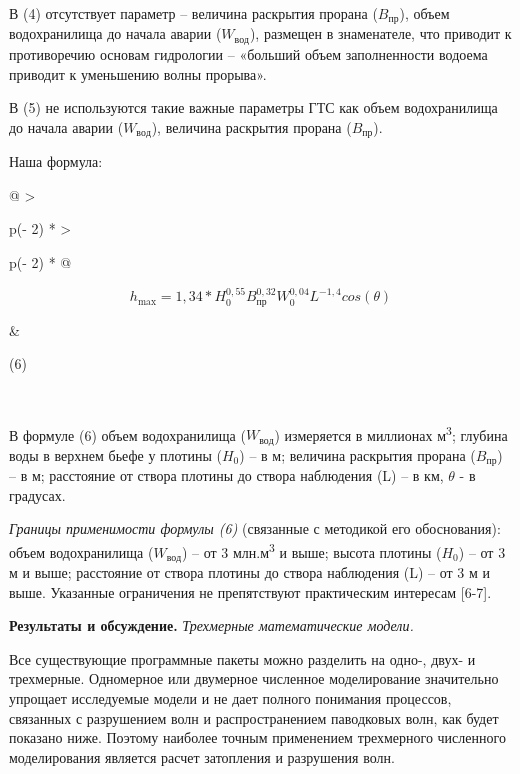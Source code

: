 В (4) отсутствует параметр -- величина раскрытия прорана (\(B_{пр}\)),
объем водохранилища до начала аварии (\(W_{вод}\)), размещен в
знаменателе, что приводит к противоречию основам гидрологии -- «больший
объем заполненности водоема приводит к уменьшению волны прорыва».

В (5) не используются такие важные параметры ГТС как объем водохранилища
до начала аварии (\(W_{вод}\)), величина раскрытия прорана (\(B_{пр}\)).

Наша формула:

\begin{longtable}[]{@{}
  >{\raggedright\arraybackslash}p{(\columnwidth - 2\tabcolsep) * }
  >{\raggedright\arraybackslash}p{(\columnwidth - 2\tabcolsep) * }@{}}
\toprule\noalign{}
\begin{minipage}[b]{\linewidth}\raggedright
\[h_{\max} = 1,34*H_{0}^{0,55}B_{пр}^{0,32}W_{0}^{0,04}L^{- 1,4}cos(\theta)\]
\end{minipage} & \begin{minipage}[b]{\linewidth}\raggedright
(6)
\end{minipage} \\
\midrule\noalign{}
\endhead
\bottomrule\noalign{}
\endlastfoot
\end{longtable}

В формуле (6) объем водохранилища (\(W_{вод}\)) измеряется в миллионах
м\textsuperscript{3}; глубина воды в верхнем бьефе у плотины (\(H_{0}\))
-- в м; величина раскрытия прорана (\(B_{пр}\)) -- в м; расстояние от
створа плотины до створа наблюдения (L) -- в км, \(\theta\) - в
градусах.

\emph{Границы применимости формулы (6)} (связанные с методикой его
обоснования): объем водохранилища (\(W_{вод}\)) -- от 3
млн.м\textsuperscript{3} и выше; высота плотины (\(H_{0}\)) -- от 3 м и
выше; расстояние от створа плотины до створа наблюдения (L) -- от 3 м и
выше. Указанные ограничения не препятствуют практическим интересам
{[}6-7{]}.

\textbf{Результаты и обсуждение.} \emph{Трехмерные математические
модели.}

Все существующие программные пакеты можно разделить на одно-, двух- и
трехмерные. Одномерное или двумерное численное моделирование значительно
упрощает исследуемые модели и не дает полного понимания процессов,
связанных с разрушением волн и распространением паводковых волн, как
будет показано ниже. Поэтому наиболее точным применением трехмерного
численного моделирования является расчет затопления и разрушения волн.


